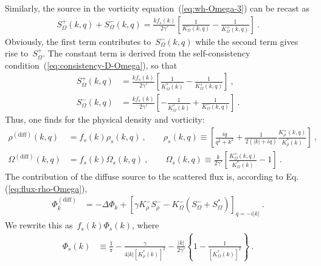 \documentclass[preprint,aps,eqsecnum, prb]{revtex4-1}
\newcommand{\fplus}[1]{{#1}^{+}}
\newcommand{\fminus}[1]{{#1}^{-}}
\begin{document}
Similarly, the source in the vorticity equation~(\ref{eq:wh-Omega-3}) can be
recast as
\begin{align}
  \fplus{S}_\Omega(k, q) + \fminus{S}_\Omega(k, q) =
  \frac{k f_s(k)}{2\gamma'} \left[\frac{1}{\fminus{K}_\Omega(k, q)}
  - \frac{1}{\fplus{K}_\Omega(k, q)} \right]\ .
\end{align}
Obviously, the first term contributes to~$\fminus{S}_\Omega(k, q)$
while the second term gives rise to~$\fplus{S}_\Omega$. The constant
term is derived from the self-consistency
condition~(\ref{eq:consistency-D-Omega}), so that
\begin{align}
  \fplus{S}_\Omega(k, q) &= \frac{k f_s(k)}{2\gamma'}
  \left[\frac{1}{K^\ast_\Omega(k)} - \frac{1}{\fplus{K}_\Omega(k, q)}
  \right] \ , \\\nonumber
  \fminus{S}_\Omega(k, q) &= \frac{k f_s(k)}{2\gamma'}
  \left[-\frac{1}{K^\ast_\Omega(k)} + \frac{1}{\fminus{K}_\Omega(k, q)}
  \right] \ .
\end{align}
Thus, one finds for the physical density and vorticity:
\begin{align}
  \label{eq:rho-s}
  \rho^\mathrm{(diff)}(k, q) &= f_s(k) \rho_s(k, q)\ ,
                               \qquad \rho_s(k, q) \equiv
  \left[\frac{iq}{q^2 + k^2} + \frac{1}{2(|k| + iq)}
   \frac{\fplus{K}_{\rho}(k, q)}{K_\rho^\ast(k)}
  \right]
  \ , \\
  \label{eq:omega-s}
  \Omega^\mathrm{(diff)}(k, q) &= f_s(k) \Omega_s(k, q)\ , \qquad
                  \Omega_s(k, q) \equiv \frac{k}{2\gamma'} \left[
  \frac{\fplus{K}_\Omega(k, q)}{K_\Omega^\ast(k)} - 1
  \right]\ .
\end{align}
The contribution of the diffuse source to
the scattered flux is, according to Eq.(\ref{eq:flux-rho-Omega}),
\begin{align}
  \label{eq:phi-diff}
  \Phi^\mathrm{(diff)}_k &= -\Delta\Phi_{k} +
  \left[\gamma \fminus{K}_\rho \fminus{S}_\rho
  - \fminus{K}_\Omega \left(\fminus{S}_\Omega
                           + S_\Omega^\ast\right)\right]_{q = -i |k|}\ .
\end{align}
We rewrite this as~$f_s(k) \Phi_s(k)$, where
\begin{align}
  \Phi_s(k) &\equiv
                       \frac{1}{\pi}
   - \frac{\gamma}{4|k| \left[K_\rho^\ast(k)\right]^2}
                - \frac{|k|}{2\gamma'}
                 \left\{1 - \frac{1}{\left[K_\Omega^\ast(k)\right]^2} \right\}
   \nonumber
  \ .
\end{align}
\end{document}
